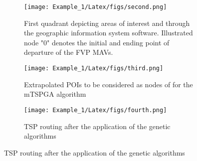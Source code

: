 \documentclass[preprint,review, 11pt,3p,authoryear]{elsarticle}
\begin{document}
{\begin{figure}
  \medskip

  
  \begin{subfigure}{0.95\linewidth}
    \centering\texttt{[image: Example\_1/Latex/figs/second.png]}
    \caption{First quadrant depicting areas of interest and through the geographic information system software. Illustrated node "0" denotes the initial and ending point of departure of the FVP MAVs.}
  \end{subfigure}
  \begin{subfigure}{0.95\linewidth}
    \centering\texttt{[image: Example\_1/Latex/figs/third.png]}
    \caption{Extrapolated POIs to be considered as nodes of for the mTSPGA algorithm}
  \end{subfigure}
  \begin{subfigure}{0.95\linewidth}
    \centering\texttt{[image: Example\_1/Latex/figs/fourth.png]}
    \caption{TSP routing after the application of the genetic algorithms }
  \end{subfigure}

  \end{figure}
    
    
 






}
\end{document}
